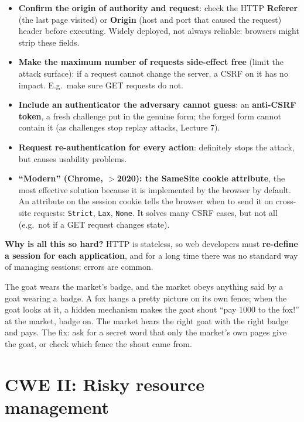 \begin{propbox}[title={How to avoid CSRF}]
\begin{itemize}
  \item \textbf{Confirm the origin of authority and request}: check the HTTP \textbf{Referer} (the
        last page visited) or \textbf{Origin} (host and port that caused the request) header
        before executing. Widely deployed, not always reliable: browsers might strip these fields.
  \item \textbf{Make the maximum number of requests side-effect free} (limit the attack surface):
        if a request cannot change the server, a CSRF on it has no impact. E.g.\ make sure GET
        requests do not.
  \item \textbf{Include an authenticator the adversary cannot guess}: an \textbf{anti-CSRF token},
        a fresh challenge put in the genuine form; the forged form cannot contain it (as
        challenges stop replay attacks, Lecture 7).
  \item \textbf{Request re-authentication for every action}: definitely stops the attack, but
        causes usability problems.
  \item \textbf{``Modern'' (Chrome, $>$2020): the SameSite cookie attribute}, the most effective
        solution because it is implemented by the browser by default. An attribute on the session
        cookie tells the browser when to send it on cross-site requests: \texttt{Strict},
        \texttt{Lax}, \texttt{None}. It solves many CSRF cases, but not all (e.g.\ not if a GET
        request changes state).
\end{itemize}
\textbf{Why is all this so hard?} HTTP is stateless, so web developers must \textbf{re-define a
session for each application}, and for a long time there was no standard way of managing sessions:
errors are common.
\end{propbox}

\begin{goatbox}
The goat wears the market's badge, and the market obeys anything said by a goat wearing a badge.
A fox hangs a pretty picture on its own fence; when the goat looks at it, a hidden mechanism makes
the goat shout ``pay 1000 to the fox!'' at the market, badge on. The market hears the right goat
with the right badge and pays. The fix: ask for a secret word that only the market's own pages give
the goat, or check which fence the shout came from.
\end{goatbox}

\section{CWE II: Risky resource management}

